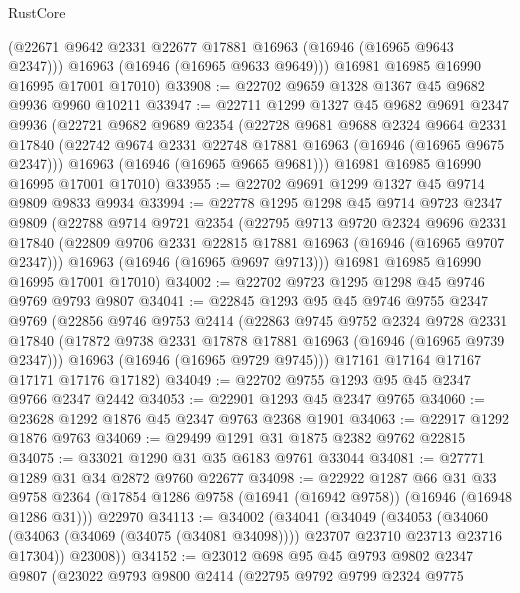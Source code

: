 \begin{lexlean}{RustCore}
\begin{coremodule}
        (@22671 @9642 @2331 @22677 @17881 @16963 (@16946 (@16965 @9643 @2347)))
        @16963
        (@16946 (@16965 @9633 @9649)))
      @16981
      @16985
      @16990
      @16995
      @17001
      @17010)
@33908 := @22702 @9659 @1328 @1367 @45 @9682 @9936 @9960 @10211
@33947 := @22711
    @1299
    @1327
    @45
    @9682
    @9691
    @2347
    @9936
    (@22721
      @9682
      @9689
      @2354
      (@22728
        @9681
        @9688
        @2324
        @9664
        @2331
        @17840
        (@22742 @9674 @2331 @22748 @17881 @16963 (@16946 (@16965 @9675 @2347)))
        @16963
        (@16946 (@16965 @9665 @9681)))
      @16981
      @16985
      @16990
      @16995
      @17001
      @17010)
@33955 := @22702 @9691 @1299 @1327 @45 @9714 @9809 @9833 @9934
@33994 := @22778
    @1295
    @1298
    @45
    @9714
    @9723
    @2347
    @9809
    (@22788
      @9714
      @9721
      @2354
      (@22795
        @9713
        @9720
        @2324
        @9696
        @2331
        @17840
        (@22809 @9706 @2331 @22815 @17881 @16963 (@16946 (@16965 @9707 @2347)))
        @16963
        (@16946 (@16965 @9697 @9713)))
      @16981
      @16985
      @16990
      @16995
      @17001
      @17010)
@34002 := @22702 @9723 @1295 @1298 @45 @9746 @9769 @9793 @9807
@34041 := @22845
    @1293
    @95
    @45
    @9746
    @9755
    @2347
    @9769
    (@22856
      @9746
      @9753
      @2414
      (@22863
        @9745
        @9752
        @2324
        @9728
        @2331
        @17840
        (@17872 @9738 @2331 @17878 @17881 @16963 (@16946 (@16965 @9739 @2347)))
        @16963
        (@16946 (@16965 @9729 @9745)))
      @17161
      @17164
      @17167
      @17171
      @17176
      @17182)
@34049 := @22702 @9755 @1293 @95 @45 @2347 @9766 @2347 @2442
@34053 := @22901 @1293 @45 @2347 @9765
@34060 := @23628 @1292 @1876 @45 @2347 @9763 @2368 @1901
@34063 := @22917 @1292 @1876 @9763
@34069 := @29499 @1291 @31 @1875 @2382 @9762 @22815
@34075 := @33021 @1290 @31 @35 @6183 @9761 @33044
@34081 := @27771 @1289 @31 @34 @2872 @9760 @22677
@34098 := @22922
    @1287
    @66
    @31
    @33
    @9758
    @2364
    (@17854 @1286 @9758 (@16941 (@16942 @9758)) (@16946 (@16948 @1286 @31)))
    @22970
@34113 := @34002
    (@34041
      (@34049
        (@34053
          (@34060 (@34063 (@34069 (@34075 (@34081 @34098)))) @23707 @23710 @23713 @23716 @17304))
        @23008))
@34152 := @23012
    @698
    @95
    @45
    @9793
    @9802
    @2347
    @9807
    (@23022
      @9793
      @9800
      @2414
      (@22795
        @9792
        @9799
        @2324
        @9775

\end{coremodule}
\end{lexlean}

